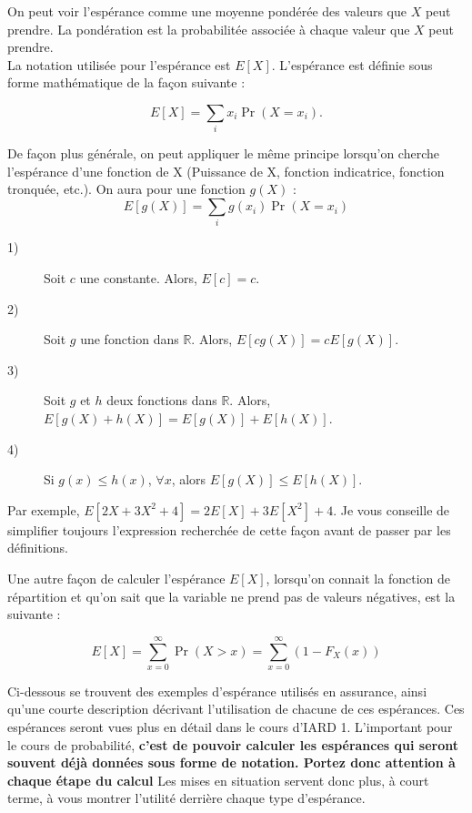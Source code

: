 \documentclass[10pt, french]{article}
\begin{document}
\begin{multicols*}{2}
\begin{definitionNOHFILL}[Espérance]

On peut voir l'espérance comme une moyenne pondérée des valeurs que $X$ peut prendre. La pondération est la probabilitée associée à chaque valeur que $X$ peut prendre.\\

La notation utilisée pour l'espérance est $E[X]$. L'espérance est définie sous forme mathématique de la façon suivante : 

$$E[X] = \sum_i x_i \Pr(X = x_i).$$

De façon plus générale, on peut appliquer le même principe lorsqu'on cherche l'espérance d'une fonction de X (Puissance de X, fonction indicatrice, fonction tronquée, etc.). On aura pour une fonction $g(X)$ : 
$$E[g(X)] = \sum_i g(x_i) \Pr(X = x_i)$$

\begin{definitionNOHFILLprop}
\begin{description}
  \item[1)] Soit $c$ une constante. Alors, $E[c] = c$.
  \item[2)] Soit $g$ une fonction dans $\mathbb{R}$. Alors, $E[cg(X)] = cE[g(X)]$.
  \item[3)] Soit $g$ et $h$ deux fonctions dans $\mathbb{R}$. Alors, $E[g(X) + h(X)] = E[g(X)] + E[h(X)]$.
  \item[4)] Si $g(x) \leq h(x)$, $\forall x$, alors $ E[g(X)] \leq E[h(X)]$.
\end{description}

Par exemple, $E[2X + 3X^2 + 4] = 2E[X] + 3E[X^2] + 4 $. Je vous conseille de simplifier toujours l'expression recherchée de cette façon avant de passer par les définitions.
\end{definitionNOHFILLprop}


Une autre façon de calculer l'espérance $E[X]$, lorsqu'on connait la fonction de répartition et qu'on sait que la variable ne prend pas de valeurs négatives, est la suivante :
 
$$E[X] =  \sum_{x=0}^\infty \Pr(X>x) = \sum_{x=0}^\infty (1 - F_X (x))$$
\end{definitionNOHFILL}

Ci-dessous se trouvent des exemples d'espérance utilisés en assurance, ainsi qu'une courte description décrivant l'utilisation de chacune de ces espérances. Ces espérances seront vues plus en détail dans le cours d'IARD 1. L'important pour le cours de probabilité, \textbf{c'est de pouvoir calculer les espérances qui seront souvent déjà données sous forme de notation. Portez donc attention à chaque étape du calcul} Les mises en situation servent donc plus, à court terme, à vous montrer l'utilité derrière chaque type d'espérance. \\


\end{multicols*}
\end{document}
